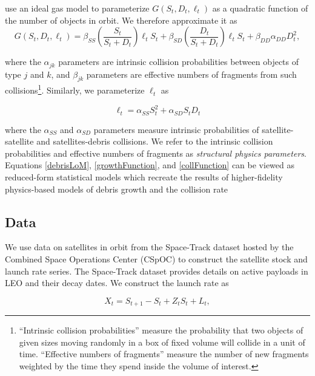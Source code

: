 \documentclass[12pt]{article}
\begin{document}
\cite{bradleywein2009} use an ideal gas model to parameterize $G(S_t,D_t,\ell_t)$ as a quadratic function of the number of objects in orbit. We therefore approximate it as
\begin{equation}
\label{growthFunction}
G(S_t,D_t,\ell_t) = \beta_{SS} \left( \frac{S_t}{S_t+D_t} \right ) \ell_t S_t + \beta_{SD}\left( \frac{D_t}{S_t+D_t} \right ) \ell_t S_t +  \beta_{DD} \alpha_{DD} D_t^2,
\end{equation}

where the $\alpha_{jk}$ parameters are intrinsic collision probabilities between objects of type $j$ and $k$, and $\beta_{jk}$ parameters are effective numbers of fragments from such collisions\footnote{``Intrinsic collision probabilities'' measure the probability that two objects of given sizes moving randomly in a box of fixed volume will collide in a unit of time. ``Effective numbers of fragments'' measure the number of new fragments weighted by the time they spend inside the volume of interest.}. Similarly, we parameterize $\ell_t$ as

\begin{equation}
\label{collFunction}
\ell_t = \alpha_{SS} S_t^2 + \alpha_{SD} S_t D_t
\end{equation}

where the $\alpha_{SS}$ and $\alpha_{SD}$ parameters measure intrinsic probabilities of satellite-satellite and satellites-debris collisions. We refer to the intrinsic collision probabilities and effective numbers of fragments as \textit{structural physics parameters}. Equations \ref{debrisLoM}, \ref{growthFunction}, and \ref{collFunction} can be viewed as reduced-form statistical models which recreate the results of higher-fidelity physics-based models of debris growth and the collision rate

\subsection{Data}

We use data on satellites in orbit from the Space-Track dataset hosted by the Combined Space Operations Center (CSpOC) \citep{spacetrackData} to construct the satellite stock and launch rate series. The Space-Track dataset provides details on active payloads in LEO and their decay dates. We construct the launch rate as

\begin{equation}
X_t = S_{t+1} - S_t + Z_tS_t + L_t,
\end{equation}
\end{document}
